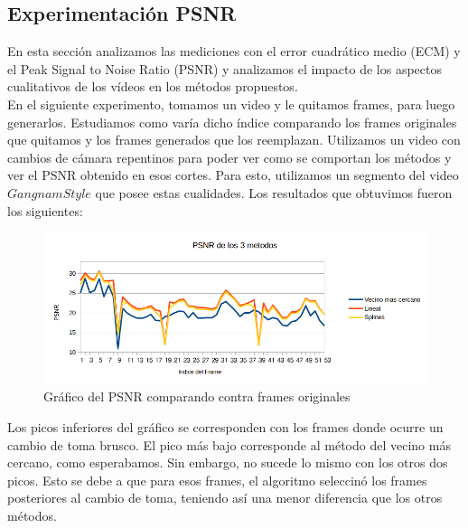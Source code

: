 \subsection{Experimentación PSNR}

En esta sección analizamos las mediciones con el error cuadrático medio (ECM) y el Peak Signal to Noise Ratio (PSNR) y analizamos el impacto de los aspectos cualitativos de los vídeos en los métodos propuestos. \\

En el siguiente experimento, tomamos un video y le quitamos frames, para luego generarlos. Estudiamos como varía dicho índice comparando los frames originales que quitamos y los frames generados que los reemplazan. Utilizamos un video con cambios de cámara repentinos para poder ver como se comportan los métodos y ver el PSNR obtenido en esos cortes. Para esto, utilizamos un segmento del video $Gangnam Style$ que posee estas cualidades.
Los resultados que obtuvimos fueron los siguientes:


\begin{figure}[h!]
  \caption{Gráfico del PSNR comparando contra frames originales}
  \centering
    \includegraphics[scale=0.75]{imagenes/PSNRGangnam.png}
\end{figure}

Los picos inferiores del gráfico se corresponden con los frames donde ocurre un cambio de toma brusco. El pico más bajo corresponde al método del vecino más cercano, como esperabamos. Sin embargo, no sucede lo mismo con los otros dos picos. Esto se debe a que para esos frames, el algoritmo seleccinó los frames posteriores al cambio de toma, teniendo así una menor diferencia que los otros métodos.







